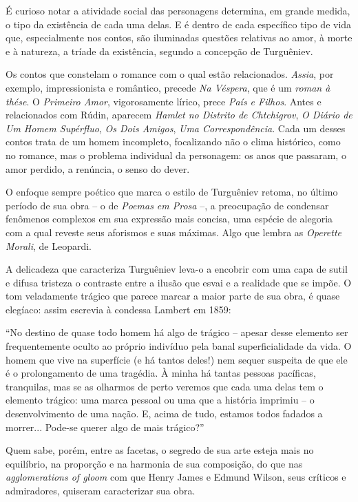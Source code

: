 É curioso notar a atividade social das personagens determina, em grande
medida, o tipo da existência de cada uma delas. E é dentro de cada
específico tipo de vida que, especialmente nos contos, são iluminadas
questões relativas ao amor, à morte e à natureza, a tríade da
existência, segundo a concepção de Turguêniev.

Os contos que constelam o romance com o qual estão relacionados.
\emph{Assia}, por exemplo, impressionista e romântico, precede \emph{Na
Véspera}, que é um \emph{roman à thése}. O \emph{Primeiro Amor},
vigorosamente lírico, prece \emph{País e Filhos}. Antes e relacionados
com Rúdin, aparecem \emph{Hamlet no Distrito de Chtchigrov}, \emph{O
Diário de Um Homem Supérfluo}, \emph{Os Dois Amigos}, \emph{Uma
Correspondência}. Cada um desses contos trata de um homem incompleto,
focalizando não o clima histórico, como no romance, mas o problema
individual da personagem: os anos que passaram, o amor perdido, a
renúncia, o senso do dever.

O enfoque sempre poético que marca o estilo de Turguêniev retoma, no
último período de sua obra -- o de \emph{Poemas em Prosa} --, a
preocupação de condensar fenômenos complexos em sua expressão mais
concisa, uma espécie de alegoria com a qual reveste seus aforismos e
suas máximas. Algo que lembra as \emph{Operette Morali}, de Leopardi.

A delicadeza que caracteriza Turguêniev leva-o a encobrir com uma capa
de sutil e difusa tristeza o contraste entre a ilusão que esvai e a
realidade que se impõe. O tom veladamente trágico que parece marcar a
maior parte de sua obra, é quase elegíaco: assim escrevia à condessa
Lambert em 1859:

``No destino de quase todo homem há algo de trágico -- apesar desse
elemento ser frequentemente oculto ao próprio indivíduo pela banal
superficialidade da vida. O homem que vive na superfície (e há tantos
deles!) nem sequer suspeita de que ele é o prolongamento de uma
tragédia. À minha há tantas pessoas pacíficas, tranquilas, mas se as
olharmos de perto veremos que cada uma delas tem o elemento trágico: uma
marca pessoal ou uma que a história imprimiu -- o desenvolvimento de uma
nação. E, acima de tudo, estamos todos fadados a morrer... Pode-se
querer algo de mais trágico?''

Quem sabe, porém, entre as facetas, o segredo de sua arte esteja mais no
equilíbrio, na proporção e na harmonia de sua composição, do que nas
\emph{agglomerations of gloom} com que Henry James e Edmund Wilson, seus
críticos e admiradores, quiseram caracterizar sua obra.

